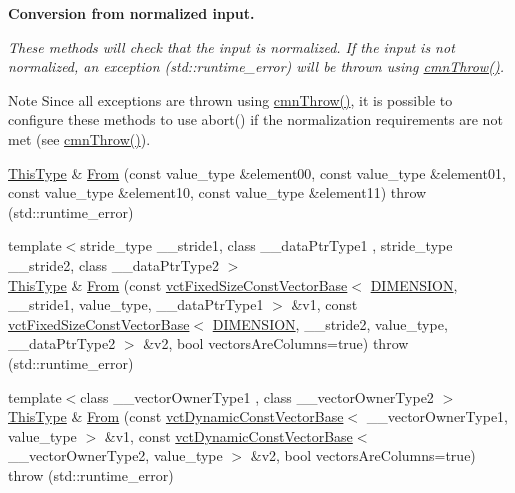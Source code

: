 \begin{Indent}{\bf Conversion from normalized input.}\par
{\em These methods will check that the input is normalized. If the input is not normalized, an exception ({\ttfamily std\-::runtime\-\_\-error}) will be thrown using \hyperlink{_minimal_cmn_8h_ad50e82cf9c9dbd0e6443c13e0d1a6f1a}{cmn\-Throw()}.

\begin{DoxyNote}{Note}
Since all exceptions are thrown using \hyperlink{_minimal_cmn_8h_ad50e82cf9c9dbd0e6443c13e0d1a6f1a}{cmn\-Throw()}, it is possible to configure these methods to use {\ttfamily abort()} if the normalization requirements are not met (see \hyperlink{_minimal_cmn_8h_ad50e82cf9c9dbd0e6443c13e0d1a6f1a}{cmn\-Throw()}). 
\end{DoxyNote}
}\begin{DoxyCompactItemize}
\item 
\hyperlink{classvct_matrix_rotation2_base_a47ffeef2ddecede4b16bcc88fb432ff5}{This\-Type} \& \hyperlink{classvct_matrix_rotation2_base_a73d45665d2dd263429022f275f04b983}{From} (const value\-\_\-type \&element00, const value\-\_\-type \&element01, const value\-\_\-type \&element10, const value\-\_\-type \&element11)  throw (std\-::runtime\-\_\-error)
\item 
{\footnotesize template$<$stride\-\_\-type \-\_\-\-\_\-stride1, class \-\_\-\-\_\-data\-Ptr\-Type1 , stride\-\_\-type \-\_\-\-\_\-stride2, class \-\_\-\-\_\-data\-Ptr\-Type2 $>$ }\\\hyperlink{classvct_matrix_rotation2_base_a47ffeef2ddecede4b16bcc88fb432ff5}{This\-Type} \& \hyperlink{classvct_matrix_rotation2_base_aafcfdc3da313b9b29c0f2eeb663d38d8}{From} (const \hyperlink{classvct_fixed_size_const_vector_base}{vct\-Fixed\-Size\-Const\-Vector\-Base}$<$ \hyperlink{classvct_matrix_rotation2_base_ac10279ed12ec787b1a4833ea02771348acefb9855f54f0cfd782e785c9083e592}{D\-I\-M\-E\-N\-S\-I\-O\-N}, \-\_\-\-\_\-stride1, value\-\_\-type, \-\_\-\-\_\-data\-Ptr\-Type1 $>$ \&v1, const \hyperlink{classvct_fixed_size_const_vector_base}{vct\-Fixed\-Size\-Const\-Vector\-Base}$<$ \hyperlink{classvct_matrix_rotation2_base_ac10279ed12ec787b1a4833ea02771348acefb9855f54f0cfd782e785c9083e592}{D\-I\-M\-E\-N\-S\-I\-O\-N}, \-\_\-\-\_\-stride2, value\-\_\-type, \-\_\-\-\_\-data\-Ptr\-Type2 $>$ \&v2, bool vectors\-Are\-Columns=true)  throw (std\-::runtime\-\_\-error)
\item 
{\footnotesize template$<$class \-\_\-\-\_\-vector\-Owner\-Type1 , class \-\_\-\-\_\-vector\-Owner\-Type2 $>$ }\\\hyperlink{classvct_matrix_rotation2_base_a47ffeef2ddecede4b16bcc88fb432ff5}{This\-Type} \& \hyperlink{classvct_matrix_rotation2_base_a41c9c7b9397b18b3029cfa9754607ba8}{From} (const \hyperlink{classvct_dynamic_const_vector_base}{vct\-Dynamic\-Const\-Vector\-Base}$<$ \-\_\-\-\_\-vector\-Owner\-Type1, value\-\_\-type $>$ \&v1, const \hyperlink{classvct_dynamic_const_vector_base}{vct\-Dynamic\-Const\-Vector\-Base}$<$ \-\_\-\-\_\-vector\-Owner\-Type2, value\-\_\-type $>$ \&v2, bool vectors\-Are\-Columns=true)  throw (std\-::runtime\-\_\-error)

\end{DoxyCompactItemize}
\end{Indent}
